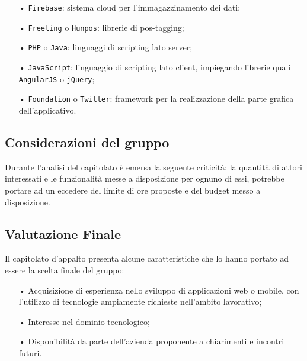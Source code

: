 \begin{itemize}
\item[•] \texttt{Firebase}: sistema cloud per l'immagazzinamento dei dati;

\item[•] \texttt{Freeling} o \texttt{Hunpos}: librerie di pos-tagging;

\item[•] \texttt{PHP} o \texttt{Java}: linguaggi di scripting lato server;

\item[•] \texttt{JavaScript}: linguaggio di scripting lato client, impiegando librerie quali \texttt{AngularJS} o \texttt{jQuery};

\item[•] \texttt{Foundation} o \texttt{Twitter}: framework per la realizzazione della parte grafica dell’applicativo.

\end{itemize}

\subsection{Considerazioni del gruppo}
Durante l’analisi del capitolato è emersa la seguente criticità:
la quantità di attori interessati e le funzionalità messe a disposizione per ognuno di essi, potrebbe portare ad un eccedere del limite di ore proposte e del budget messo a disposizione.

\subsection{Valutazione Finale}

Il capitolato d’appalto presenta alcune caratteristiche che lo hanno portato ad essere
la scelta finale del gruppo:
\begin{itemize}
\item[•] Acquisizione di esperienza nello sviluppo di applicazioni web o mobile, con l’utilizzo di tecnologie
ampiamente richieste nell’ambito lavorativo;
\item[•] Interesse nel dominio tecnologico;
\item[•] Disponibilità da parte dell'azienda proponente a chiarimenti e incontri futuri. 

\end{itemize}

